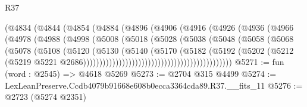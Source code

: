 \begin{lexlean}{R37}
\begin{coremodule}
                                  (@4834
                                    (@4844
                                      (@4854
                                        (@4884
                                          (@4896
                                            (@4906
                                              (@4916
                                                (@4926
                                                  (@4936
                                                    (@4966
                                                      (@4978
                                                        (@4988
                                                          (@4998
                                                            (@5008
                                                              (@5018
                                                                (@5028
                                                                  (@5038
                                                                    (@5048
                                                                      (@5058
                                                                        (@5068
                                                                          (@5078
                                                                            (@5108
                                                                              (@5120
                                                                                (@5130
                                                                                  (@5140
                                                                                    (@5170
                                                                                      (@5182
                                                                                        (@5192
                                                                                          (@5202
                                                                                            (@5212
                                                                                              (@5219
                                                                                                @5221
                                                                                                @2686))))))))))))))))))))))))))))))))))))))))))))))
@5271 := fun (word : @2545) => @4618 @5269
@5273 := @2704 @315 @4499
@5274 := LexLeanPreserve.Ccdb4079b91668e608b0ecca3364cda89.R37.__fits_11
@5276 := @2723 (@5274 @2351)

\end{coremodule}
\end{lexlean}
